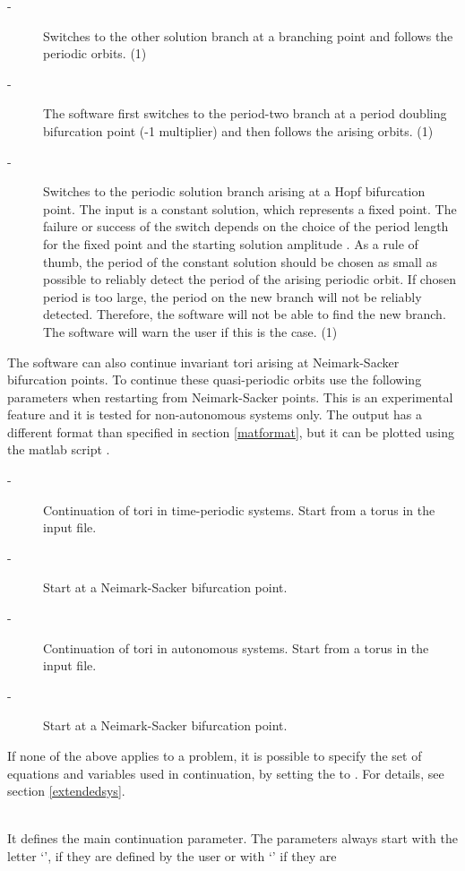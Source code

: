 \documentclass[10pt,a4paper]{ddedoc}
\begin{document}
\begin{description}
\begin{description}
%
\item[ -] Switches to the other solution branch at a branching point and
follows the periodic orbits. (1)
%
\item[ -] The software first switches to the period-two branch at a
period doubling bifurcation point
(-1 multiplier) and then follows the arising orbits. (1)
%
\item[ -] Switches to the periodic solution branch arising at a Hopf
bifurcation point. The input is a constant solution, which represents a fixed
point. The failure or success of the switch depends on the choice of the period
length for the fixed point and the starting solution amplitude .
As a rule of thumb, the period of the constant solution should be chosen as
small as possible to reliably detect the period of the arising periodic orbit.
If chosen period is too large, the period on the new branch will not be reliably detected. 
Therefore, the software will not be able to find the new branch. The software will warn 
the user if this is the case. (1)
\end{description}
The software can also continue invariant tori arising at Neimark-Sacker
bifurcation points. To continue these quasi-periodic orbits use the following
parameters when restarting from Neimark-Sacker points. This is an experimental
feature and  it is tested for non-autonomous systems only. The output has a different format
than specified in section \ref{matformat}, but it can be plotted using the matlab script 
.
\begin{description}
\item[ -] Continuation of tori in time-periodic systems. Start from a torus in the input file.
\item[ -] Start at a Neimark-Sacker bifurcation point.
%
\item[ -] Continuation of tori in autonomous systems. Start from a torus in the input file.
\item[ -] Start at a Neimark-Sacker bifurcation point.
\end{description}
If none of the above applies to a problem, it is possible to specify the set of
equations and variables used in continuation, by setting the  to
. For details, see section \ref{extendedsys}.
%
\item[\funp{CP}] ~\\
It defines the main continuation parameter. The parameters always start with the
letter `', if they are defined by the user or with `' if they are

\end{description}
\end{document}
